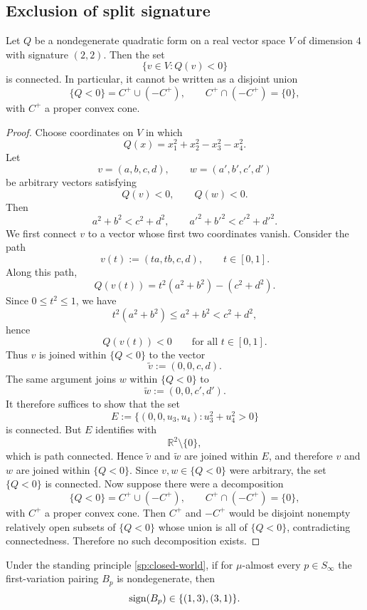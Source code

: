 \subsection{Exclusion of split signature}
\begin{lemma}
	\label{lem:no-split}
	Let \(Q\) be a nondegenerate quadratic form on a real vector space \(V\)
	of dimension \(4\) with signature \((2,2)\).  Then the set
	\[
		\{v\in V:Q(v)<0\}
	\]
	is connected.  In particular, it cannot be written as a disjoint union
	\[
		\{Q<0\}=C^+\cup(-C^+),
		\qquad
		C^+\cap(-C^+)=\{0\},
	\]
	with \(C^+\) a proper convex cone.
\end{lemma}
\begin{proof}
	Choose coordinates on \(V\) in which
	\[
		Q(x)=x_1^2+x_2^2-x_3^2-x_4^2.
	\]
	Let
	\[
		v=(a,b,c,d),\qquad w=(a',b',c',d')
	\]
	be arbitrary vectors satisfying
	\[
		Q(v)<0,\qquad Q(w)<0.
	\]
	Then
	\[
		a^2+b^2<c^2+d^2,
		\qquad
		a'^2+b'^2<c'^2+d'^2.
	\]
	We first connect \(v\) to a vector whose first two coordinates vanish.
	Consider the path
	\[
		v(t):=(ta,tb,c,d),
		\qquad
		t\in[0,1].
	\]
	Along this path,
	\[
		Q(v(t))=t^2(a^2+b^2)-(c^2+d^2).
	\]
	Since \(0\le t^2\le 1\), we have
	\[
		t^2(a^2+b^2)\le a^2+b^2<c^2+d^2,
	\]
	hence
	\[
		Q(v(t))<0
		\qquad
		\text{for all }t\in[0,1].
	\]
	Thus \(v\) is joined within \(\{Q<0\}\) to the vector
	\[
		\tilde v:=(0,0,c,d).
	\]
	The same argument joins \(w\) within \(\{Q<0\}\) to
	\[
		\tilde w:=(0,0,c',d').
	\]
	It therefore suffices to show that the set
	\[
		E:=\{(0,0,u_3,u_4):u_3^2+u_4^2>0\}
	\]
	is connected.  But \(E\) identifies with
	\[
		\mathbb R^2\setminus\{0\},
	\]
	which is path connected.  Hence \(\tilde v\) and \(\tilde w\) are joined
	within \(E\), and therefore \(v\) and \(w\) are joined within
	\(\{Q<0\}\).
	Since \(v,w\in\{Q<0\}\) were arbitrary, the set \(\{Q<0\}\) is
	connected.
	Now suppose there were a decomposition
	\[
		\{Q<0\}=C^+\cup(-C^+),
		\qquad
		C^+\cap(-C^+)=\{0\},
	\]
	with \(C^+\) a proper convex cone.  Then \(C^+\) and \(-C^+\) would be
	disjoint nonempty relatively open subsets of \(\{Q<0\}\) whose union is
	all of \(\{Q<0\}\), contradicting connectedness.  Therefore no such
	decomposition exists.
\end{proof}
\begin{theorem}
	\label{thm:lorentz-forced}
	Under the standing principle \cref{sp:closed-world}, if for
	\(\mu\)-almost every \(p\in S_\infty\) the first-variation pairing
	\(B_p\) is nondegenerate, then
	\[
		\operatorname{sign}(B_p)\in\{(1,3),(3,1)\}.
	\]
\end{theorem}
